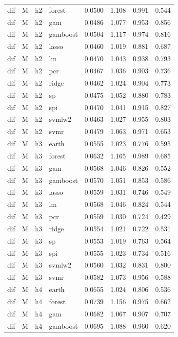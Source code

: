 \begin{ThreePartTable}
\begin{longtable}[t]{llclcccc}
dif & M & h2 & forest & 0.0500 & 1.108 & 0.991 & 0.544\\
dif & M & h2 & gam & 0.0486 & 1.077 & 0.953 & 0.856\\
dif & M & h2 & gamboost & 0.0504 & 1.117 & 0.974 & 0.816\\
dif & M & h2 & lasso & 0.0460 & 1.019 & 0.881 & 0.687\\
dif & M & h2 & lm & 0.0470 & 1.043 & 0.938 & 0.793\\
dif & M & h2 & pcr & 0.0467 & 1.036 & 0.903 & 0.736\\
dif & M & h2 & ridge & 0.0462 & 1.024 & 0.904 & 0.773\\
dif & M & h2 & sp & 0.0475 & 1.052 & 0.880 & 0.783\\
dif & M & h2 & spi & 0.0470 & 1.041 & 0.915 & 0.827\\
dif & M & h2 & svmlw2 & 0.0463 & 1.027 & 0.955 & 0.803\\
dif & M & h2 & svmr & 0.0479 & 1.063 & 0.971 & 0.653\\
\addlinespace
dif & M & h3 & earth & 0.0555 & 1.023 & 0.776 & 0.595\\
dif & M & h3 & forest & 0.0632 & 1.165 & 0.989 & 0.685\\
dif & M & h3 & gam & 0.0568 & 1.046 & 0.826 & 0.552\\
dif & M & h3 & gamboost & 0.0570 & 1.051 & 0.853 & 0.586\\
dif & M & h3 & lasso & 0.0559 & 1.031 & 0.746 & 0.549\\
dif & M & h3 & lm & 0.0568 & 1.046 & 0.824 & 0.544\\
dif & M & h3 & pcr & 0.0559 & 1.030 & 0.724 & 0.429\\
dif & M & h3 & ridge & 0.0554 & 1.021 & 0.722 & 0.531\\
dif & M & h3 & sp & 0.0553 & 1.019 & 0.763 & 0.564\\
dif & M & h3 & spi & 0.0555 & 1.023 & 0.734 & 0.516\\
dif & M & h3 & svmlw2 & 0.0560 & 1.032 & 0.831 & 0.800\\
dif & M & h3 & svmr & 0.0582 & 1.073 & 0.956 & 0.588\\
\addlinespace
dif & M & h4 & earth & 0.0655 & 1.024 & 0.806 & 0.536\\
dif & M & h4 & forest & 0.0739 & 1.156 & 0.975 & 0.662\\
dif & M & h4 & gam & 0.0682 & 1.067 & 0.907 & 0.707\\
dif & M & h4 & gamboost & 0.0695 & 1.088 & 0.960 & 0.620\\

\end{longtable}
\end{ThreePartTable}
